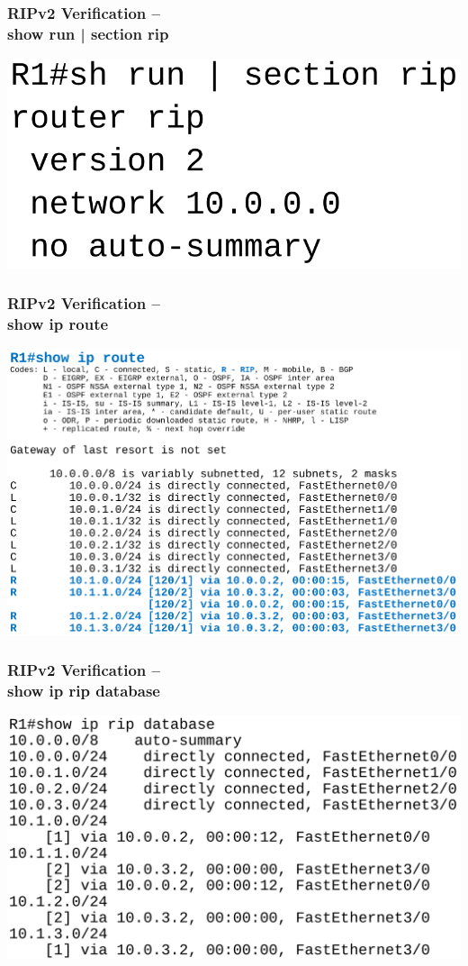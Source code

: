 \documentclass[pdflatex,compress,mathserif]{beamer}
\begin{document}
\begin{frame}
	\frametitle{RIPv2 Verification –\\ show run | section rip}
	\begin{center}
		\includegraphics[width=0.6\linewidth]{img/img05}
	\end{center}
\end{frame}

\begin{frame}
	\frametitle{RIPv2 Verification –\\ show ip route}
	\begin{center}
		\includegraphics[height=0.8\textheight]{img/img06}
	\end{center}
\end{frame}

\begin{frame}
	\frametitle{RIPv2 Verification –\\ show ip rip database}
	\begin{center}
		\includegraphics[height=0.7\textheight]{img/img07}
	\end{center}
\end{frame}
\end{document}

